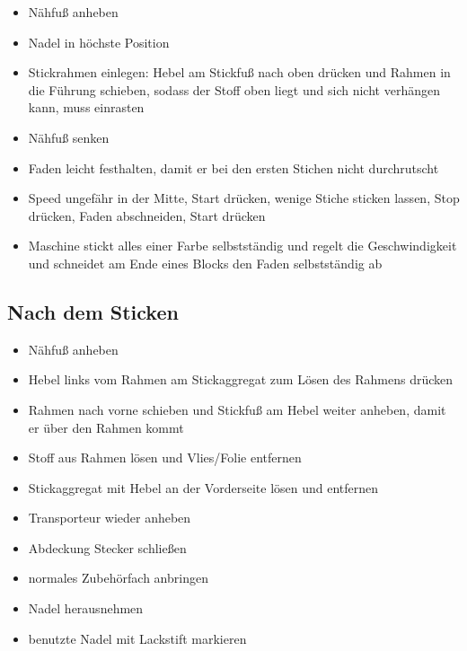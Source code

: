\documentclass{\basedir/fablab-document}
\begin{document}
\vspace{1em}

\begin{itemize}
	\item Nähfuß anheben
	\item Nadel in höchste Position
	\item Stickrahmen einlegen: Hebel am Stickfuß nach oben drücken und Rahmen in die Führung schieben, sodass der Stoff oben liegt und sich nicht verhängen kann, muss einrasten
	\item Nähfuß senken
	\item Faden leicht festhalten, damit er bei den ersten Stichen nicht durchrutscht
	\item Speed ungefähr in der Mitte, Start drücken, wenige Stiche sticken lassen, Stop drücken, Faden abschneiden, Start drücken
	\item Maschine stickt alles einer Farbe selbstständig und regelt die Geschwindigkeit und schneidet am Ende eines Blocks den Faden selbstständig ab
\end{itemize}


\subsection{Nach dem Sticken}
\begin{itemize}
	\item Nähfuß anheben
	\item Hebel links vom Rahmen am Stickaggregat zum Lösen des Rahmens drücken
	\item Rahmen nach vorne schieben und Stickfuß am Hebel weiter anheben, damit er über den Rahmen kommt
	\item Stoff aus Rahmen lösen und Vlies/Folie entfernen
	\item Stickaggregat mit Hebel an der Vorderseite lösen und entfernen
	\item Transporteur wieder anheben
	\item Abdeckung Stecker schließen
	\item normales Zubehörfach anbringen
	\item Nadel herausnehmen
	\item benutzte Nadel mit Lackstift markieren
\end{itemize}

\newpage
{}
\end{document}
